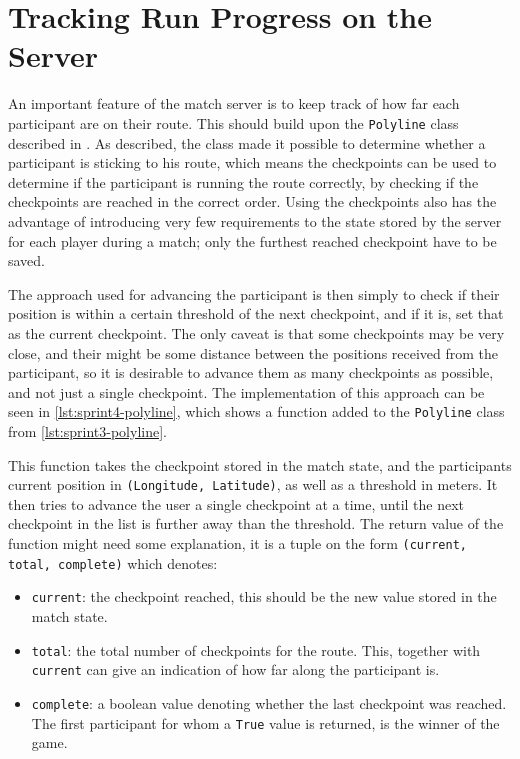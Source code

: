 \section{Tracking Run Progress on the Server}

An important feature of the match server is to keep track of how far each participant are on their route. This should build upon the \texttt{Polyline} class described in \label{sec:sprint3-gameserver}. As described, the class made it possible to determine whether a participant is sticking to his route, which means the checkpoints can be used to determine if the participant is running the route correctly, by checking if the checkpoints are reached in the correct order. Using the checkpoints also has the advantage of introducing very few requirements to the state stored by the server for each player during a match; only the furthest reached checkpoint have to be saved.

The approach used for advancing the participant is then simply to check if their position is within a certain threshold of the next checkpoint, and if it is, set that as the current checkpoint. The only caveat is that some checkpoints may be very close, and their might be some distance between the positions received from the participant, so it is desirable to advance them as many checkpoints as possible, and not just a single checkpoint. The implementation of this approach can be seen in \autoref{lst:sprint4-polyline}, which shows a function added to the \texttt{Polyline} class from \autoref{lst:sprint3-polyline}.

This function takes the checkpoint stored in the match state, and the participants current position in \texttt{(Longitude, Latitude)}, as well as a threshold in meters. It then tries to advance the user a single checkpoint at a time, until the next checkpoint in the list is further away than the threshold. The return value of the function might need some explanation, it is a tuple on the form \texttt{(current, total, complete)} which denotes:
\begin{itemize}
 \item \texttt{current}: the checkpoint reached, this should be the new value stored in the match state.
 \item \texttt{total}: the total number of checkpoints for the route. This, together with \texttt{current} can give an indication of how far along the participant is.
 \item \texttt{complete}: a boolean value denoting whether the last checkpoint was reached. The first participant for whom a \texttt{True} value is returned, is the winner of the game.
\end{itemize}

